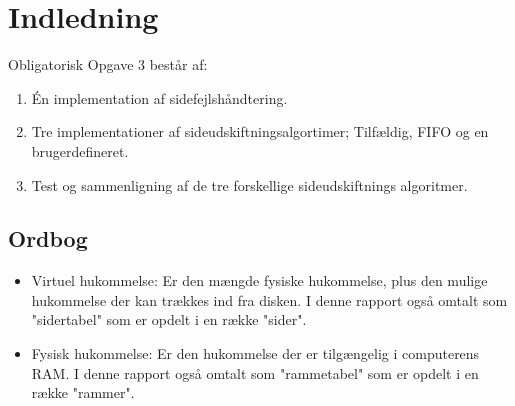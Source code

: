 \section{Indledning}
Obligatorisk Opgave 3 består af:

\begin{enumerate}
	\item Én implementation af sidefejlshåndtering.
	\item Tre implementationer af sideudskiftningsalgortimer; Tilfældig, FIFO og en brugerdefineret.
	\item Test og sammenligning af de tre forskellige sideudskiftnings algoritmer.
\end{enumerate}

\subsection{Ordbog}
\begin{itemize}
	\item Virtuel hukommelse: Er den mængde fysiske hukommelse, plus den mulige hukommelse der kan trækkes ind fra disken. I denne rapport også omtalt som "sidertabel" som er opdelt i en række "sider".
	\item Fysisk hukommelse: Er den hukommelse der er tilgængelig i computerens RAM. I denne rapport også omtalt som "rammetabel" som er opdelt i en række "rammer".
\end{itemize}
